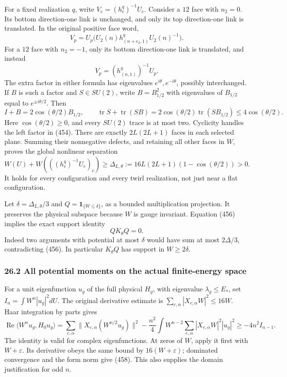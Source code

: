 \documentclass[
  11pt,
]{article}
\begin{document}
For a fixed realization \(q\), write \(V_e=(h_e^q)^{-1}U_e\). Consider a
\(12\) face with \(n_2=0\). Its bottom direction-one link is unchanged,
and only its top direction-one link is translated. In the original
positive face word, \[
 V_p=U_p\bigl(U_2(n)h_{(n+e_2,1)}^qU_2(n)^{-1}\bigr).
 \tag{453}
\] For a \(12\) face with \(n_2=-1\), only its bottom direction-one link
is translated, and instead \[
 V_p=(h_{(n,1)}^q)^{-1}U_p .
 \tag{454}
\] The extra factor in either formula has eigenvalues
\(e^{i\theta},e^{-i\theta}\), possibly interchanged. If \(B\) is such a
factor and \(S\in SU(2)\), write \(B=B_{1/2}^2\) with eigenvalues of
\(B_{1/2}\) equal to \(e^{\pm i\theta/2}\). Then \[
 I+B=2\cos(\theta/2)B_{1/2},\qquad
 \operatorname{tr}S+\operatorname{tr}(SB)
       =2\cos(\theta/2)\operatorname{tr}(SB_{1/2})
       \le4\cos(\theta/2).
 \tag{455}
\] Here \(\cos(\theta/2)\ge0\), and every \(SU(2)\) trace is at most
two. Cyclicity handles the left factor in (454). There are exactly
\(2L(2L+1)\) faces in each selected plane. Summing their nonnegative
defects, and retaining all other faces in \(W\), proves the global
nonlinear separation \[
 \boxed{W(U)+W(((h_e^q)^{-1}U_e)_e)
    \ge\Delta_{L,\theta}:=
       16L(2L+1)(1-\cos(\theta/2))>0.}
 \tag{456}
\] It holds for every configuration and every twirl realization, not
just near a flat configuration.

Let \(\delta=\Delta_{L,\theta}/3\) and \(Q=\mathbf1_{\{W\le\delta\}}\),
as a bounded multiplication projection. It preserves the physical
subspace because \(W\) is gauge invariant. Equation (456) implies the
exact support identity \[
 QK_\theta Q=0.
 \tag{457}
\] Indeed two arguments with potential at most \(\delta\) would have sum
at most \(2\Delta/3\), contradicting (456). In particular \(K_\theta Q\)
has support in \(W\ge2\delta\).

\subsubsection{26.2 All potential moments on the actual finite-energy
space}\label{all-potential-moments-on-the-actual-finite-energy-space}

For a unit eigenfunction \(u_g\) of the full physical \(H_g\), with
eigenvalue \(\lambda_g\le E_*\), set \(I_n=\int W^n|u_g|^2dU\). The
original derivative estimate is
\(\sum_{e,\alpha}|X_{e,\alpha}W|^2\le16W\). Haar integration by parts
gives \[
 \operatorname{Re}\langle W^nu_g,H_0u_g\rangle
 =\sum_{e,\alpha}\|X_{e,\alpha}(W^{n/2}u_g)\|^2
       -\frac{n^2}{4}\int W^{n-2}
                  \sum_{e,\alpha}|X_{e,\alpha}W|^2|u_g|^2
 \ge-4n^2I_{n-1}.
 \tag{458}
\] The identity is valid for complex eigenfunctions. At zeros of \(W\),
apply it first with \(W+\varepsilon\). Its derivative obeys the same
bound by \(16(W+\varepsilon)\); dominated convergence and the form norm
give (458). This also supplies the domain justification for odd \(n\).
\end{document}
